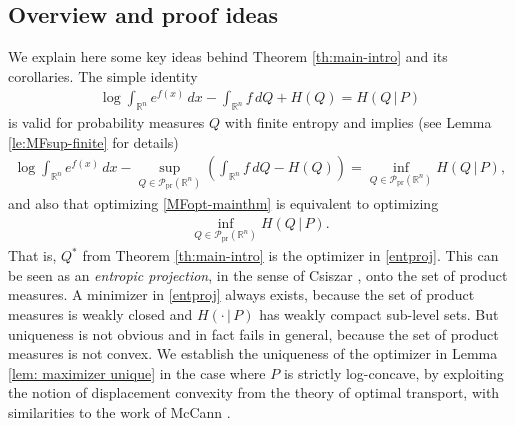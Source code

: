 \documentclass[11pt,reqno]{amsart}
\numberwithin{equation}{section}
\theoremstyle{definition}
\def\R{{\mathbb R}}
\def\P{{\mathcal P}}
\def\Pprod{\P_{\mathrm{pr}}}
\begin{document}
\subsection{Overview and proof ideas} \label{se:proofideas}
We explain here some key ideas behind Theorem \ref{th:main-intro} and its corollaries.
The simple identity 
\begin{align}
	\log \int_{\R^n} e^{f(x)}\,dx - \int_{\R^n} f\,dQ + H(Q) = H(Q\,|\,P) \label{entproj-id0}
\end{align}
is valid for probability measures $Q$ with finite entropy and implies (see Lemma \ref{le:MFsup-finite} for details)
\begin{align}
	\log \int_{\R^n} e^{f(x)}\,dx - \sup_{Q \in \Pprod(\R^n)}\left(\int_{\R^n} f\,dQ - H(Q)\right) = \inf_{Q \in \Pprod(\R^n)} H(Q\,|\,P), \label{entproj-id1}
\end{align}
and also that optimizing \eqref{MFopt-mainthm} is equivalent to optimizing
\begin{align}
	\inf_{Q \in \Pprod(\R^n)} H(Q\,|\,P).  \label{entproj}
\end{align}
That is, $Q^*$ from Theorem \ref{th:main-intro} is the optimizer in \eqref{entproj}.
This can be seen as an \emph{entropic projection}, in the sense of Csiszar \cite{csiszar1975divergence}, onto the set of product measures. A minimizer in \eqref{entproj} always exists, because the set of product measures is weakly closed and $H(\cdot\,|\,P)$ has weakly compact sub-level sets. But uniqueness is not obvious and in fact fails in general, because the set of product measures is not convex.
We establish the uniqueness of the optimizer in Lemma \ref{lem: maximizer unique} in the case where $P$ is strictly log-concave, by exploiting the notion of displacement convexity from the theory of optimal transport, with similarities to the work of McCann \cite{mccann1997convexity}.
\end{document}

